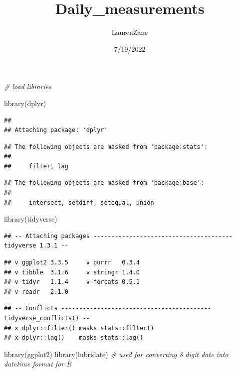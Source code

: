 \documentclass[
]{article}
\title{Daily\_measurements}
\author{LaurenZane}
\date{7/19/2022}
\newenvironment{Shaded}{\begin{snugshade}}{\end{snugshade}}
\newcommand{\CommentTok}[1]{\textcolor[rgb]{0.56,0.35,0.01}{\textit{#1}}}
\newcommand{\FunctionTok}[1]{\textcolor[rgb]{0.00,0.00,0.00}{#1}}
\newcommand{\NormalTok}[1]{#1}
\begin{document}
\maketitle

\begin{Shaded}
\begin{Highlighting}[]
\CommentTok{\# load libraries }

\FunctionTok{library}\NormalTok{(dplyr)}
\end{Highlighting}
\end{Shaded}

\begin{verbatim}
## 
## Attaching package: 'dplyr'
\end{verbatim}

\begin{verbatim}
## The following objects are masked from 'package:stats':
## 
##     filter, lag
\end{verbatim}

\begin{verbatim}
## The following objects are masked from 'package:base':
## 
##     intersect, setdiff, setequal, union
\end{verbatim}

\begin{Shaded}
\begin{Highlighting}[]
\FunctionTok{library}\NormalTok{(tidyverse)}
\end{Highlighting}
\end{Shaded}

\begin{verbatim}
## -- Attaching packages --------------------------------------- tidyverse 1.3.1 --
\end{verbatim}

\begin{verbatim}
## v ggplot2 3.3.5     v purrr   0.3.4
## v tibble  3.1.6     v stringr 1.4.0
## v tidyr   1.1.4     v forcats 0.5.1
## v readr   2.1.0
\end{verbatim}

\begin{verbatim}
## -- Conflicts ------------------------------------------ tidyverse_conflicts() --
## x dplyr::filter() masks stats::filter()
## x dplyr::lag()    masks stats::lag()
\end{verbatim}

\begin{Shaded}
\begin{Highlighting}[]
\FunctionTok{library}\NormalTok{(ggplot2)}
\FunctionTok{library}\NormalTok{(lubridate) }\CommentTok{\# used for converting 8 digit date into datetime format for R}
\end{Highlighting}
\end{Shaded}
\end{document}

